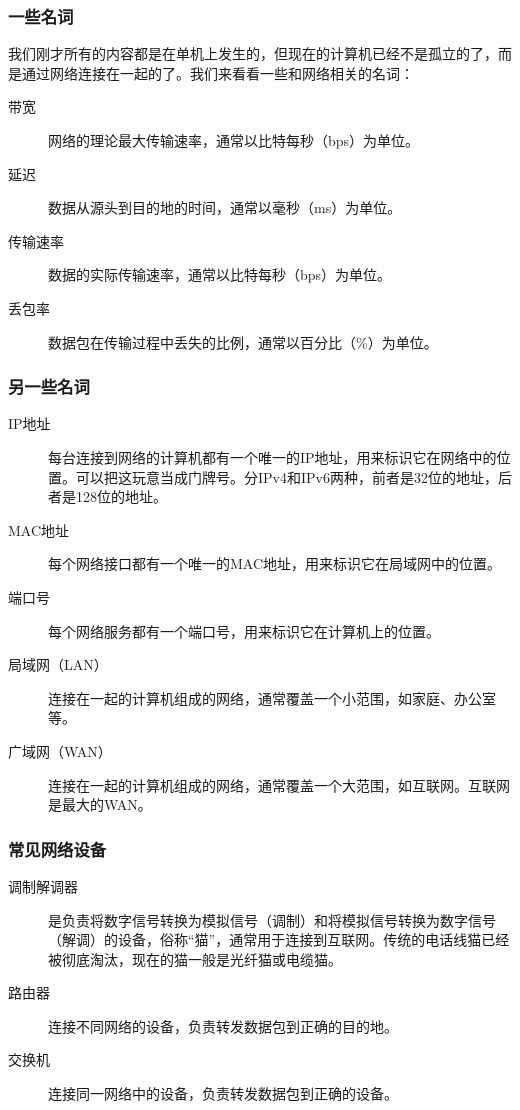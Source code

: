 \documentclass[fontset=none,aspectratio=1610]{ctexbeamer}
\begin{document}
\begin{frame}
    \frametitle{一些名词}

    我们刚才所有的内容都是在单机上发生的，但现在的计算机已经不是孤立的了，而是通过网络连接在一起的了。我们来看看一些和网络相关的名词：
    \begin{description}
        \item[带宽] 网络的理论最大传输速率，通常以比特每秒（bps）为单位。
        \item[延迟] 数据从源头到目的地的时间，通常以毫秒（ms）为单位。
        \item[传输速率] 数据的实际传输速率，通常以比特每秒（bps）为单位。
        \item[丢包率] 数据包在传输过程中丢失的比例，通常以百分比（\%）为单位。 
    \end{description}

\end{frame}

\begin{frame}
    \frametitle{另一些名词}

    \begin{description}
        \item[IP地址] 每台连接到网络的计算机都有一个唯一的IP地址，用来标识它在网络中的位置。可以把这玩意当成门牌号。分IPv4和IPv6两种，前者是32位的地址，后者是128位的地址。
        \item[MAC地址] 每个网络接口都有一个唯一的MAC地址，用来标识它在局域网中的位置。
        \item[端口号] 每个网络服务都有一个端口号，用来标识它在计算机上的位置。
        \item[局域网（LAN）] 连接在一起的计算机组成的网络，通常覆盖一个小范围，如家庭、办公室等。
        \item[广域网（WAN）] 连接在一起的计算机组成的网络，通常覆盖一个大范围，如互联网。互联网是最大的WAN。 
    \end{description}

\end{frame}

\begin{frame}
    \frametitle{常见网络设备}

    \begin{description}
        \item[调制解调器] 是负责将数字信号转换为模拟信号（调制）和将模拟信号转换为数字信号（解调）的设备，俗称“猫”，通常用于连接到互联网。传统的电话线猫已经被彻底淘汰，现在的猫一般是光纤猫或电缆猫。
        \item[路由器] 连接不同网络的设备，负责转发数据包到正确的目的地。
        \item[交换机] 连接同一网络中的设备，负责转发数据包到正确的设备。
    \end{description}

\end{frame}
\end{document}
